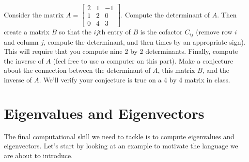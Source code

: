 \begin{problem}
 Consider the matrix
$A=\begin{bmatrix}
2&1&-1\\1&2&0\\0&4&3 
\end{bmatrix}.$
 Compute the determinant of $A$.  Then create a matrix $B$ so that the $ij$th entry of $B$ is the cofactor $C_{ij}$ (remove row $i$ and column $j$, compute the determinant, and then times by an appropriate sign).  This will require that you compute nine 2 by 2 determinants.  Finally, compute the inverse of $A$ (feel free to use a computer on this part). Make a conjecture about the connection between the determinant of $A$, this matrix $B$, and the inverse of $A$.  We'll verify your conjecture is true on a 4 by 4 matrix in class. 
\end{problem}



\section{Eigenvalues and Eigenvectors}

The final computational skill we need to tackle is to compute eigenvalues and eigenvectors.  
Let's start by looking at an example to motivate the language we are about to introduce.  

